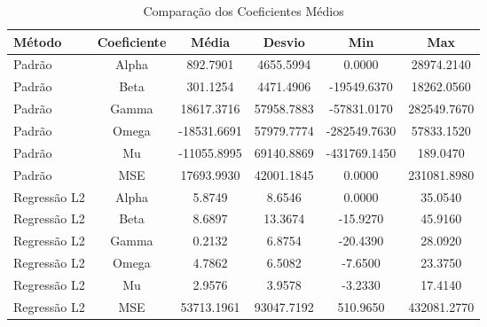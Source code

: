 \begin{table}[h]
\centering
\caption{Comparação dos Coeficientes Médios}
\label{tab:coeficientes}
\begin{tabular}{lccccc}
\hline
\textbf{Método} & \textbf{Coeficiente} & \textbf{Média} & \textbf{Desvio} & \textbf{Min} & \textbf{Max} \\
\hline
Padrão & Alpha & 892.7901 & 4655.5994 & 0.0000 & 28974.2140 \\
Padrão & Beta & 301.1254 & 4471.4906 & -19549.6370 & 18262.0560 \\
Padrão & Gamma & 18617.3716 & 57958.7883 & -57831.0170 & 282549.7670 \\
Padrão & Omega & -18531.6691 & 57979.7774 & -282549.7630 & 57833.1520 \\
Padrão & Mu & -11055.8995 & 69140.8869 & -431769.1450 & 189.0470 \\
Padrão & MSE & 17693.9930 & 42001.1845 & 0.0000 & 231081.8980 \\
Regressão L2 & Alpha & 5.8749 & 8.6546 & 0.0000 & 35.0540 \\
Regressão L2 & Beta & 8.6897 & 13.3674 & -15.9270 & 45.9160 \\
Regressão L2 & Gamma & 0.2132 & 6.8754 & -20.4390 & 28.0920 \\
Regressão L2 & Omega & 4.7862 & 6.5082 & -7.6500 & 23.3750 \\
Regressão L2 & Mu & 2.9576 & 3.9578 & -3.2330 & 17.4140 \\
Regressão L2 & MSE & 53713.1961 & 93047.7192 & 510.9650 & 432081.2770 \\
\hline
\end{tabular}
\end{table}
